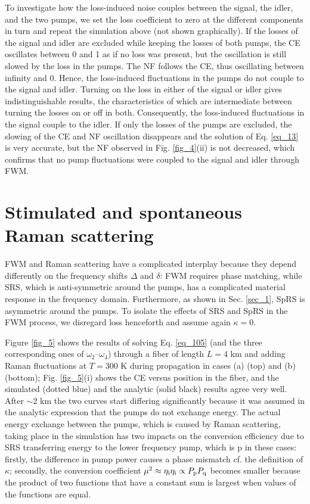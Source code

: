\documentclass[10pt,letterpaper]{article}
\begin{document}
To investigate how the loss-induced noise couples between the signal, the idler, and the two pumps, we set the loss coefficient to zero at the different components in turn and repeat the simulation above (not shown graphically). If the losses of the signal and idler are excluded while keeping the losses of both pumps, the CE oscillates between 0 and 1 as if no loss was present, but the oscillation is still slowed by the loss in the pumps. The NF follows the CE, thus oscillating between infinity and 0. Hence, the loss-induced fluctuations in the pumps do not couple to the signal and idler. Turning on the loss in either of the signal or idler gives indistinguishable results, the characteristics of which are intermediate between turning the losses on or off in both. Consequently, the loss-induced fluctuations in the signal couple to the idler. If only the losses of the pumps are excluded, the slowing of the CE and NF oscillation disappears and the solution of Eq. \eqref{eq_13} is very accurate, but the NF observed in Fig. \ref{fig_4}(ii) is not decreased, which confirms that no pump fluctuations were coupled to the signal and idler through FWM.



%
%
%
%
\section{Stimulated and spontaneous Raman scattering}
FWM and Raman scattering have a complicated interplay because they depend differently on the frequency shifts $\Delta$ and $\delta$: FWM requires phase matching, while SRS, which is anti-symmetric around the pumps, has a complicated material response in the frequency domain. Furthermore, as shown in Sec. \ref{sec_1}, SpRS is asymmetric around the pumps. To isolate the effects of SRS and SpRS in the FWM process, we disregard loss henceforth and assume again $\kappa = 0$.

Figure \ref{fig_5} shows the results of solving Eq. \eqref{eq_105} (and the three corresponding ones of $\omega_2$--$\omega_4$) through a fiber of length $L = 4$ km and adding Raman fluctuations at $T = 300$ K during propagation in cases (a) (top) and (b) (bottom); Fig. \ref{fig_5}(i) shows the CE versus position in the fiber, and the simulated (dotted blue) and the analytic (solid black) results agree very well. After $\sim 2$ km the two curves start differing significantly because it was assumed in the analytic expression that the pumps do not exchange energy. The actual energy exchange between the pumps, which is caused by Raman scattering, taking place in the simulation has two impacts on the conversion efficiency due to SRS transferring energy to the lower frequency pump, which is p in these cases: firstly, the difference in pump power causes a phase mismatch cf. the definition of $\kappa$; secondly, the conversion coefficient $\mu^2 \approx \eta_{\rm i} \eta_{\rm i} \propto P_{\rm p}P_{\rm q}$ becomes smaller because the product of two functions that have a constant sum is largest when values of the functions are equal.
\end{document}
